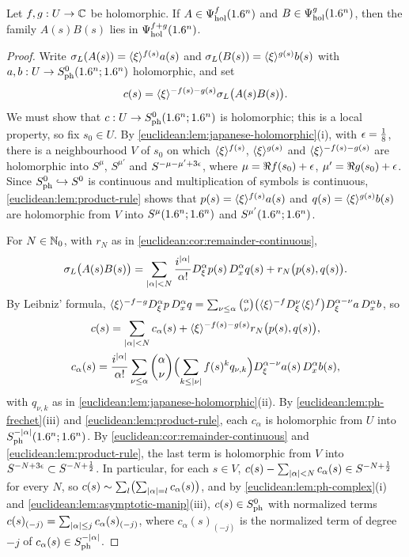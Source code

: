 \begin{proposition}\label{euclidean:prop:hol-composition}
  Let $f,g:U\to\mathbb{C}$ be holomorphic. If $A\in\Psi^{f}_{\mathrm{hol}}(1.6^n)$
  and $B\in\Psi^{g}_{\mathrm{hol}}(1.6^n)$, then the family $A(s)B(s)$ lies in
  $\Psi^{f+g}_{\mathrm{hol}}(1.6^n)$.
\end{proposition}
\begin{proof}
  Write $\sigma_L(A(s))=\langle \xi\rangle^{f(s)}a(s)$ and
  $\sigma_L(B(s))=\langle \xi\rangle^{g(s)}b(s)$ with $a,b:U\to S^{0}_{\mathrm{ph}}(1.6^n;1.6^n)$
  holomorphic, and set
  \begin{equation*}
    c(s)=\langle \xi\rangle^{-f(s)-g(s)}\sigma_L\bigl(A(s)B(s)\bigr).
  \end{equation*}
  We must show that $c:U\to S^{0}_{\mathrm{ph}}(1.6^n;1.6^n)$ is holomorphic; this is a
  local property, so fix $s_0\in U$. By
  \cref{euclidean:lem:japanese-holomorphic}(i), with $\epsilon=\frac18$, there is
  a neighbourhood $V$ of $s_0$ on which $\langle \xi\rangle^{f(s)}$, $\langle \xi\rangle^{g(s)}$ and
  $\langle \xi\rangle^{-f(s)-g(s)}$ are holomorphic into $S^{\mu}$, $S^{\mu'}$ and
  $S^{-\mu-\mu'+3\epsilon}$, where $\mu=\Re f(s_0)+\epsilon$, $\mu'=\Re g(s_0)+\epsilon$.
  Since $S^{0}_{\mathrm{ph}}\hookrightarrow S^0$ is continuous and multiplication of
  symbols is continuous, \cref{euclidean:lem:product-rule} shows that
  $p(s)=\langle \xi\rangle^{f(s)}a(s)$ and $q(s)=\langle \xi\rangle^{g(s)}b(s)$ are holomorphic from
  $V$ into $S^{\mu}(1.6^n;1.6^n)$ and $S^{\mu'}(1.6^n;1.6^n)$.

  For $N\in\mathbb{N}_0$, with $r_N$ as in \cref{euclidean:cor:remainder-continuous},
  \begin{equation*}
    \sigma_L\bigl(A(s)B(s)\bigr)=\sum_{\lvert \alpha\rvert<N}\frac{i^{\lvert \alpha\rvert}}{\alpha!}
    D^\alpha_\xi p(s)\,D^\alpha_xq(s)+r_N\bigl(p(s),q(s)\bigr).
  \end{equation*}
  By Leibniz' formula,
  $\langle \xi\rangle^{-f-g}D^\alpha_\xi p\,D^\alpha_xq=\sum_{\nu\le\alpha}\binom\alpha\nu
  \bigl(\langle \xi\rangle^{-f}D^\nu_\xi\langle \xi\rangle^{f}\bigr)D^{\alpha-\nu}_\xi a\,D^\alpha_xb$, so
  \begin{gather*}
    c(s)=\sum_{\lvert \alpha\rvert<N}c_\alpha(s)+\langle \xi\rangle^{-f(s)-g(s)}r_N\bigl(p(s),q(s)\bigr),\\
    c_\alpha(s)=\frac{i^{\lvert \alpha\rvert}}{\alpha!}\sum_{\nu\le\alpha}\binom\alpha\nu
    \Bigl(\sum_{k\le\lvert \nu\rvert}f(s)^kq_{\nu,k}\Bigr)D^{\alpha-\nu}_\xi a(s)\,D^\alpha_xb(s),
  \end{gather*}
  with $q_{\nu,k}$ as in \cref{euclidean:lem:japanese-holomorphic}(ii). By
  \cref{euclidean:lem:ph-frechet}(iii) and \cref{euclidean:lem:product-rule},
  each $c_\alpha$ is holomorphic from $U$ into $S^{-\lvert \alpha\rvert}_{\mathrm{ph}}(1.6^n;1.6^n)$.
  By \cref{euclidean:cor:remainder-continuous} and
  \cref{euclidean:lem:product-rule}, the last term is holomorphic from $V$
  into $S^{-N+3\epsilon}\subset S^{-N+\frac12}$. In particular, for each $s\in V$,
  $c(s)-\sum_{\lvert \alpha\rvert<N}c_\alpha(s)\in S^{-N+\frac12}$ for every $N$, so
  $c(s)\sim\sum_l\bigl(\sum_{\lvert \alpha\rvert=l}c_\alpha(s)\bigr)$, and by
  \cref{euclidean:lem:ph-complex}(i) and
  \cref{euclidean:lem:asymptotic-manip}(iii), $c(s)\in S^{0}_{\mathrm{ph}}$ with
  normalized terms
  $c(s)_{(-j)}=\sum_{\lvert \alpha\rvert\le j}c_\alpha(s)_{(-j)}$, where
  $c_\alpha(s)_{(-j)}$ is the normalized term of degree $-j$ of
  $c_\alpha(s)\in S^{-\lvert \alpha\rvert}_{\mathrm{ph}}$.


\end{proof}

